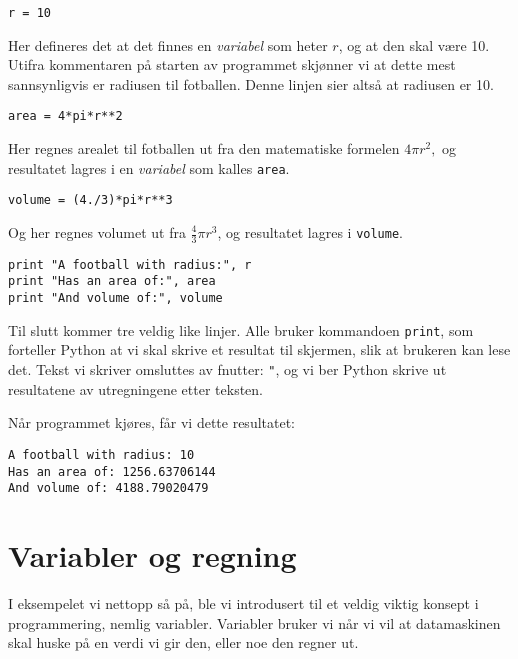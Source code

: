 \documentclass[a4paper, 11pt, notitlepage]{article}
\begin{document}
\vspace{0.4cm}
\begin{lstlisting}
r = 10
\end{lstlisting}
\vspace{-0.3cm}
Her defineres det at det finnes en \emph{variabel} som heter $r$, og at den skal være 10. Utifra kommentaren på starten av programmet skjønner vi at dette mest sannsynligvis er radiusen til fotballen. Denne linjen sier altså at radiusen er 10.

\vspace{0.4cm}
\begin{lstlisting}
area = 4*pi*r**2
\end{lstlisting}
\vspace{-0.3cm}
Her regnes arealet til fotballen ut fra den matematiske formelen $4\pi r^2,$
og resultatet lagres i en \emph{variabel} som kalles \verb+area+.

\vspace{0.4cm}
\begin{lstlisting}
volume = (4./3)*pi*r**3
\end{lstlisting}
\vspace{-0.3cm}
Og her regnes volumet ut fra $\frac{4}{3}\pi r^3$, og resultatet lagres i \verb+volume+.

\vspace{0.4cm}
\begin{lstlisting}
print "A football with radius:", r
print "Has an area of:", area 
print "And volume of:", volume
\end{lstlisting}
\vspace{-0.3cm}
Til slutt kommer tre veldig like linjer. Alle bruker kommandoen \verb+print+, som forteller Python at vi skal skrive et resultat til skjermen, slik at brukeren kan lese det. Tekst vi skriver omsluttes av fnutter: \verb+"+, og vi ber Python skrive ut resultatene av utregningene etter teksten.

Når programmet kjøres, får vi dette resultatet:
\begin{lstlisting}
A football with radius: 10
Has an area of: 1256.63706144
And volume of: 4188.79020479
\end{lstlisting}

\section*{Variabler og regning}
I eksempelet vi nettopp så på, ble vi introdusert til et veldig viktig konsept i programmering, nemlig variabler. Variabler bruker vi når vi vil at datamaskinen skal huske på en verdi vi gir den, eller noe den regner ut.
\end{document}
